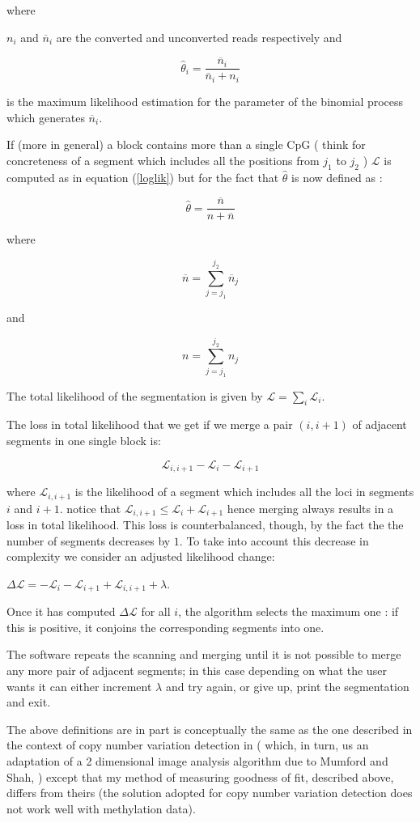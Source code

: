 \documentclass[11pt]{amsart}
\newcommand{\lik}{\ensuremath{\mathcal{L}}}
\begin{document}
where

$n_i$ and $\overline{n}_i$ are the converted and unconverted reads respectively 
and

\[\hat{\theta}_i=\frac{\overline{n}_i}{\overline{n}_i+n_i}\]

is the maximum likelihood estimation for the parameter of the binomial process 
which generates $\overline{n}_i$.

If (more in general) a block contains  more than a single CpG  
( think for concreteness of a segment which includes all the positions from 
$j_1$ to $j_2$ ) $\lik$ is 
computed as in equation (\ref{loglik}) but for the fact that $\hat{\theta}$ is now
defined as :

\[
\hat{\theta}=\frac{\overline{n}}{n + \overline{n}}
\]

where

\[
\overline{n}=\sum_{j=j_1}^{j_2} \overline{n}_j
\]

and

\[
n=\sum_{j=j_1}^{j_2} n_j
\]

The total likelihood of the segmentation is given by 
$\mathcal{L}=\sum_i\mathcal{L}_i$.

The loss in 
total likelihood that we get if we merge a pair $(i,i+1)$ of 
adjacent segments in one single block is:

\[\mathcal{L}_{i,i+1}-\mathcal{L}_i-\mathcal{L}_{i+1}\]

where $\mathcal{L}_{i,i+1}$ is the likelihood of a segment which includes
all the loci in segments $i$ and $i+1$.
notice that $\mathcal{L}_{i,i+1} \leq \mathcal{L}_i+\mathcal{L}_{i+1}$ hence merging always 
results in a loss in total 
likelihood. This loss is counterbalanced, though, by the fact the the number 
of segments decreases by $1$. To take into account this decrease in 
complexity we consider an adjusted likelihood change:

$\Delta  \lik = -\mathcal{L}_i-\mathcal{L}_{i+1}+\mathcal{L}_{i,i+1} + \lambda$.

Once it has computed 
$\Delta  \lik$ for all $i$, the algorithm selects the maximum 
one : if this is positive, it conjoins the corresponding segments into one.

The software repeats the scanning and merging until it is not possible to 
merge any more pair of adjacent segments; in this case depending on what the 
user wants it can either increment $\lambda$ and try again, 
or give up, print the segmentation and exit.

The above definitions are in part   is conceptually the same as the one
described in the context of copy number variation detection in \cite{vega} 
( which, in turn, us an adaptation 
of a 2 dimensional image analysis algorithm due to Mumford and Shah, 
\cite{mumfordshah}) except that my method of measuring goodness of fit, described
above, differs from theirs (the solution adopted for copy number variation detection
does not work well with methylation data).
\end{document}
